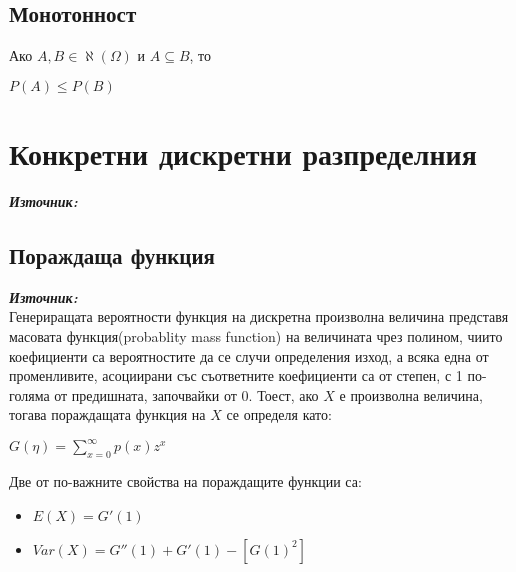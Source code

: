 \documentclass[11pt]{article} %
\newcommand{\italicBold}[1]{\textbf{\emph{#1}}}
\newcommand{\source}{\italicBold{Източник: }}
\begin{document}
\subsection{Монотонност}
Ако $A,B \in \aleph(\Omega)$ и $A \subseteq B$, то\\
\centerline{$P(A) \leq P(B)$}

\section{Конкретни дискретни разпределния}
\source {}\\

\subsection{Пораждаща функция}
\source {}\\
Генериращата вероятности функция на дискретна произволна величина представя масовата функция(probablity mass function) на величината чрез полином, чиито коефициенти са вероятностите да се случи определения изход, а всяка една от променливите, асоциирани със съответните коефициенти са от степен, с 1 по-голяма от предишната, започвайки от 0. Тоест, ако $X$ е произволна величина, тогава пораждащата функция на $X$ се определя като:\\
\centerline{$G(\eta)=\displaystyle \sum_{x=0}^{\infty} p(x)z^{x}$} 
Две от по-важните свойства на пораждащите функции са:
\begin{itemize}[noitemsep]
	\item $E(X)=G'(1)$
	\item $Var(X)=G''(1)+G'(1)-[G(1)^{2}]$
\end{itemize} 
\end{document}
